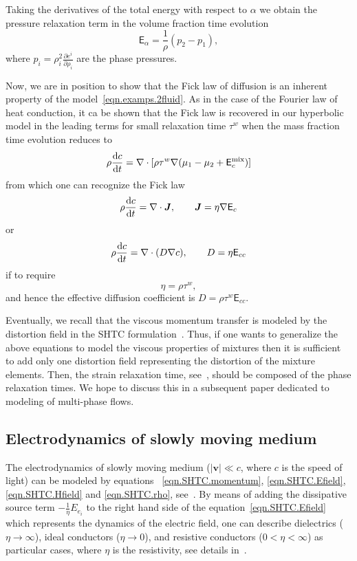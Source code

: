 \documentclass[twoside]{article}
\newcommand{\vv}{{\boldsymbol{v}}}
\newcommand{\JJ}{{\boldsymbol{J}}}
\newcommand{\ted}{E} %
\newcommand{\tes}{\mathsf{E}} %
\newcommand{\pd}{\partial}
\newcommand{\rmd}{{\rm d}}
\begin{document}
Taking the derivatives of the total energy with respect to $ \alpha $ we obtain 
the pressure relaxation term in the volume fraction time evolution
\begin{equation}\label{eqn.E_alpha}
\tes_{\alpha }=\frac{1}{\rho }(p_2-p_1 ),
\end{equation}
where $ p_i = \rho_i^2 \frac{\pd e^i}{\pd \rho_i}$ are the phase pressures.

Now, we are in position to show that the Fick law of diffusion is an 
inherent property of the model~\eqref{eqn.examps.2fluid}. As in the case of the 
Fourier law of heat conduction, it ca be 
shown that the Fick law is recovered in our hyperbolic model in the 
leading terms for small relaxation time $ \tau^w $ when the mass fraction time 
evolution reduces to 
\begin{equation}
\rho \frac{\rmd c}{\rmd t} = \nabla\cdot[\rho\tau^w\nabla(\mu_1 - \mu_2 + 
\tes_c^\text{mix})]
\end{equation}
from which one can recognize the Fick law
\begin{equation}
\rho \frac{\rmd c}{\rmd t} = \nabla\cdot\JJ, \qquad \JJ = \eta \nabla \tes_c
\end{equation}
or 
\begin{equation}
\rho \frac{\rmd c}{\rmd t} = \nabla\cdot(D\nabla c), \qquad D = \eta 
\tes_{cc}
\end{equation}
if to require 
\begin{equation}
\eta = \rho \tau^w,
\end{equation}
and hence the effective diffusion coefficient is $ D = \rho \tau^w \tes_{cc} $.

Eventually, we recall that the viscous momentum transfer is modeled by the 
distortion field in the SHTC formulation~\cite{HPR2016,DPRZ2016,DPRZ2017}. 
Thus, 
if one wants to generalize the above equations to model the viscous 
properties of mixtures then it is sufficient to add only one distortion field 
representing the distortion of the mixture elements. Then, the strain 
relaxation time, see~\cite{DPRZ2016}, should be composed of the phase 
relaxation times.  We hope to discuss this in a subsequent paper dedicated to 
modeling of multi-phase flows.

\subsection{Electrodynamics of slowly moving medium}
 The electrodynamics of slowly moving medium ($ |\vv| \ll c $, 
where $ c $ is the speed of light)
can be modeled by equations 
~\eqref{eqn.SHTC.momentum}, \eqref{eqn.SHTC.Efield}, \eqref{eqn.SHTC.Hfield} 
and \eqref{eqn.SHTC.rho}, see~\cite{DPRZ2017,elmag}. By means of adding the 
dissipative source term 
$-\frac{1}{\eta} \ted_{e_i} $ to the right hand side of the 
equation~\eqref{eqn.SHTC.Efield} which represents the dynamics of the electric 
field, one can describe dielectrics ($ \eta \rightarrow \infty $), ideal 
conductors ($ \eta \rightarrow 0 $), and 
resistive conductors ($0 < \eta < \infty $) as particular cases, where $ \eta $ 
is the resistivity, see details in~\cite{DPRZ2017,elmag}.
\end{document}
